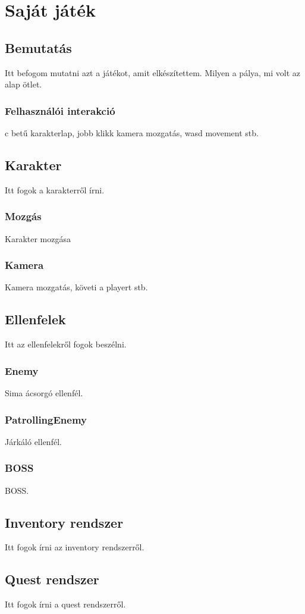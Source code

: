 \documentclass[]{thesis-ekf}
\begin{document}
\chapter{Saját játék}
\section{Bemutatás}
Itt befogom mutatni azt a játékot, amit elkészítettem. Milyen a pálya, mi volt az alap ötlet.
\subsection{Felhasználói interakció}
c betű karakterlap, jobb klikk kamera mozgatás, wasd movement stb.
\section{Karakter}
Itt fogok a karakterről írni.
\subsection{Mozgás}
Karakter mozgása
\subsection{Kamera}
Kamera mozgatás, követi a playert stb.
\section{Ellenfelek}
Itt az ellenfelekről fogok beszélni.
\subsection{Enemy}
Sima ácsorgó ellenfél.
\subsection{PatrollingEnemy}
Járkáló ellenfél.
\subsection{BOSS}
BOSS.
\section{Inventory rendszer}
Itt fogok írni az inventory rendszerről.
\section{Quest rendszer}
Itt fogok írni a quest rendszerről.
\end{document}

